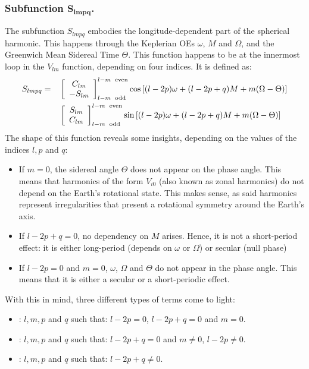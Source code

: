 		\subsubsection{Subfunction $\bm{S_{lmpq}}$.}
		\indent The subfunction $S_{lmpq}$ embodies the longitude-dependent part of the spherical harmonic. This happens through the Keplerian OEs $\omega$, $M$ and $\Omega$, and the Greenwich Mean Sidereal Time $\Theta$. This function happens to be at the innermost loop in the $V_{lm}$ function, depending on four indices. It is defined as:
		\begin{align}
		&\nonumber S_{lmpq} = && 
		\left[ \begin{array}{c}
		C_{lm}\\
		-S_{lm}
		\end{array}\right]_{l - m \text{\; odd}}^{l - m \text{\; even}} \cos \left[ (l - 2p)\omega + (l - 2p + q)M + m (\Omega - \Theta) \right] \\
		& \label{eq:S_lmpq} && 
		\left[ \begin{array}{c}
		S_{lm}\\
		C_{lm}
		\end{array}\right]_{l - m \text{\; odd}}^{l - m \text{\; even}} \sin \left[ (l - 2p)\omega + (l - 2p + q)M + m (\Omega - \Theta) \right] 
		\end{align}
		\indent The shape of this function reveals some insights, depending on the values of the indices $l, p$ and $q$:
		\begin{itemize}
		\item[\GMVred{I.}] If $m = 0$, the sidereal angle $\Theta$ does not appear on the phase angle. This means that harmonics of the form $V_{i0}$ (also known as zonal harmonics) do not depend on the Earth's rotational state. This makes sense, as said harmonics represent irregularities that present a rotational symmetry around the Earth's axis.
		\item[\GMVred{II.}] If $l - 2p + q = 0$, no dependency on $M$ arises. Hence, it is not a short-period effect: it is either long-period (depends on $\omega$ or $\Omega$) or secular (null phase)
		\item[\GMVred{III.}] If $l - 2p = 0$ and $m = 0$, $\omega$, $\Omega$ and $\Theta$ do not appear in the phase angle. This means that it is either a secular or a short-periodic effect.
		\end{itemize}
		\indent With this in mind, three different types of terms come to light:
		\begin{itemize}
		\item[\GMVred{A.}] : $l,m,p$ and $q$ such that: $l - 2p = 0$, $l - 2p + q = 0$ and $m = 0$.
		\item[\GMVred{B.}] : $l,m,p$ and $q$ such that:  $l - 2p + q = 0$ and $m \neq 0$, $l - 2p \neq 0$.
		\item[\GMVred{C.}] : $l,m,p$ and $q$ such that: $l - 2p + q \neq 0$.		
		\end{itemize}
